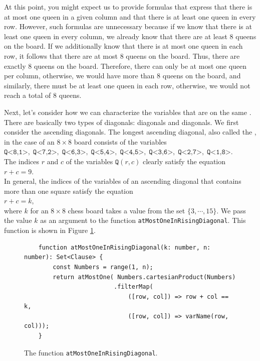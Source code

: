 At this point, you might expect us to provide formulas that express that there is at most one queen in a given column and that there is at least one queen in every row.
However, such formulas are unnecessary because if we know that there is at least one queen in every column, we already know that there are at least 8 queens on the board.
If we additionally know that there is at most one queen in each row, it follows that there are at most 8 queens on the board. Thus, there are exactly
8 queens on the board. Therefore, there can only be at most one queen per column, otherwise, we would have more than 8 queens on the board, and similarly, there must be at least one queen in each row, otherwise, we would not reach a total of 8 queens.

Next, let's consider how we can characterize the variables that are on the same .
There are basically two types of diagonals:  diagonals and  diagonals. We first consider
the ascending diagonals. The longest ascending diagonal, also called the
, in the case of an $8 \times 8$ board consists of the
variables \\[0.2cm]
\hspace*{1.3cm} 
$\texttt{Q<8,1>},\; \texttt{Q<7,2>},\; \texttt{Q<6,3>},\; \texttt{Q<5,4>},\; \texttt{Q<4,5>},\; \texttt{Q<3,6>},\; 
 \texttt{Q<2,7>},\; \texttt{Q<1,8>}$.
\\[0.2cm]
The indices $r$ and $c$ of the variables $\texttt{Q}(r,c)$ clearly satisfy
the equation \\[0.2cm]
\hspace*{1.3cm} $r + c = 9$. \\[0.2cm]
In general, the indices of the variables of an ascending diagonal that contains more than one square satisfy the
equation \\[0.2cm] 
\hspace*{1.3cm} $r + c = k$, \\[0.2cm]
where $k$ for an $8 \times 8$ chess board takes a value from the set $\{3, \cdots, 15 \}$. We pass the value $k$ as an argument to the
function \texttt{atMostOneInRisingDiagonal}. This function is shown in Figure
\ref{fig:atMostOneInUpperDiagonal}.


\begin{figure}[!ht]
  \centering
\begin{verbatim}
    function atMostOneInRisingDiagonal(k: number, n: number): Set<Clause> {
        const Numbers = range(1, n);
        return atMostOne( Numbers.cartesianProduct(Numbers)
                         .filterMap(
                             ([row, col]) => row + col == k,
                             ([row, col]) => varName(row, col)));
    }
\end{verbatim}
\vspace*{-0.3cm}
  \caption{The function \texttt{atMostOneInRisingDiagonal}.}
  \label{fig:atMostOneInUpperDiagonal}
\end{figure}

